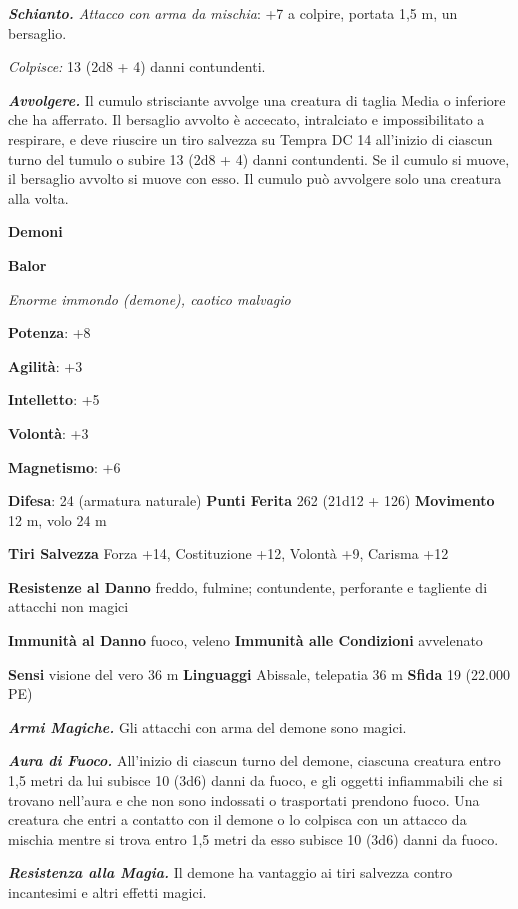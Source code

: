\begin{multicols}{2}
\emph{\textbf{Schianto.} Attacco con arma da mischia}: +7 a colpire,
portata 1,5 m, un bersaglio.

\emph{Colpisce:} 13 (2d8 + 4) danni contundenti.

\emph{\textbf{Avvolgere.}} Il cumulo strisciante avvolge una creatura di
taglia Media o inferiore che ha afferrato. Il bersaglio avvolto è
accecato, intralciato e impossibilitato a respirare, e deve riuscire un
tiro salvezza su Tempra DC 14 all'inizio di ciascun turno del
tumulo o subire 13 (2d8 + 4) danni contundenti. Se il cumulo si muove,
il bersaglio avvolto si muove con esso. Il cumulo può avvolgere solo una
creatura alla volta.

\textbf{Demoni}

\textbf{Balor}

\emph{Enorme immondo (demone), caotico malvagio}

\textbf{Potenza}: +8

\textbf{Agilità}: +3

\textbf{Intelletto}: +5

\textbf{Volontà}: +3

\textbf{Magnetismo}: +6

\textbf{Difesa}: 24 (armatura naturale) \textbf{Punti Ferita}
262 (21d12 + 126) \textbf{Movimento} 12 m, volo 24 m

\textbf{Tiri Salvezza} Forza +14, Costituzione +12, Volontà +9, Carisma
+12

\textbf{Resistenze al Danno} freddo, fulmine; contundente, perforante e
tagliente di attacchi non magici

\textbf{Immunità al Danno} fuoco, veleno \textbf{Immunità alle
Condizioni} avvelenato

\textbf{Sensi} visione del vero 36 m
\textbf{Linguaggi} Abissale, telepatia 36 m \textbf{Sfida} 19 (22.000
PE)

\emph{\textbf{Armi Magiche.}} Gli attacchi con arma del demone sono
magici.

\emph{\textbf{Aura di Fuoco.}} All'inizio di ciascun turno del demone,
ciascuna creatura entro 1,5 metri da lui subisce 10 (3d6) danni da
fuoco, e gli oggetti infiammabili che si trovano nell'aura e che non
sono indossati o trasportati prendono fuoco. Una creatura che entri a
contatto con il demone o lo colpisca con un attacco da mischia mentre si
trova entro 1,5 metri da esso subisce 10 (3d6) danni da fuoco.

\emph{\textbf{Resistenza alla Magia.}} Il demone ha vantaggio ai tiri
salvezza contro incantesimi e altri effetti magici.


\end{multicols}
